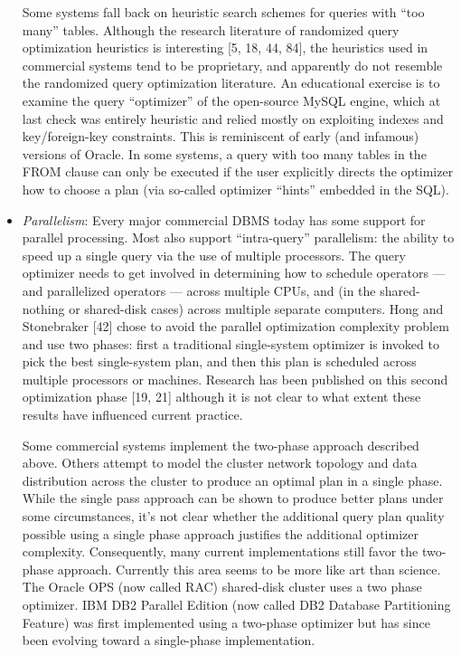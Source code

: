 \documentclass[a4paper,11pt,twoside,openright]{book}
\begin{document}
\begin{itemize}
Some systems fall back on heuristic search schemes for queries with
``too many'' tables. Although the research literature of randomized
query optimization heuristics is interesting {[}5, 18, 44, 84{]}, the
heuristics used in commercial systems tend to be proprietary, and
apparently do not resemble the randomized query optimization literature.
An educational exercise is to examine the query ``optimizer'' of the
open-source MySQL engine, which at last check was entirely heuristic and
relied mostly on exploiting indexes and key/foreign-key constraints.
This is reminiscent of early (and infamous) versions of Oracle. In some
systems, a query with too many tables in the FROM clause can only be
executed if the user explicitly directs the optimizer how to choose a
plan (via so-called optimizer ``hints'' embedded in the SQL).

\item
  \emph{Parallelism}: Every major commercial DBMS today has some support
  for parallel processing. Most also support ``intra-query''
  parallelism: the ability to speed up a single query via the use of
  multiple processors. The query optimizer needs to get involved in
  determining how to schedule operators --- and parallelized operators
  --- across multiple CPUs, and (in the shared-nothing or shared-disk
  cases) across multiple separate computers. Hong and Stonebraker
  {[}42{]} chose to avoid the parallel optimization complexity problem
  and use two phases: first a traditional single-system optimizer is
  invoked to pick the best single-system plan, and then this plan is
  scheduled across multiple processors or machines. Research has been
  published on this second optimization phase {[}19, 21{]} although it
  is not clear to what extent these results have influenced current
  practice.

Some commercial systems implement the two-phase approach described
above. Others attempt to model the cluster network topology and data
distribution across the cluster to produce an optimal plan in a single
phase. While the single pass approach can be shown to produce better
plans under some circumstances, it's not clear whether the additional
query plan quality possible using a single phase approach justifies the
additional optimizer complexity. Consequently, many current
implementations still favor the two-phase approach. Currently this area
seems to be more like art than science. The Oracle OPS (now called RAC)
shared-disk cluster uses a two phase optimizer. IBM DB2 Parallel Edition
(now called DB2 Database Partitioning Feature) was first implemented
using a two-phase optimizer but has since been evolving toward a
single-phase implementation.


\end{itemize}
\end{document}
